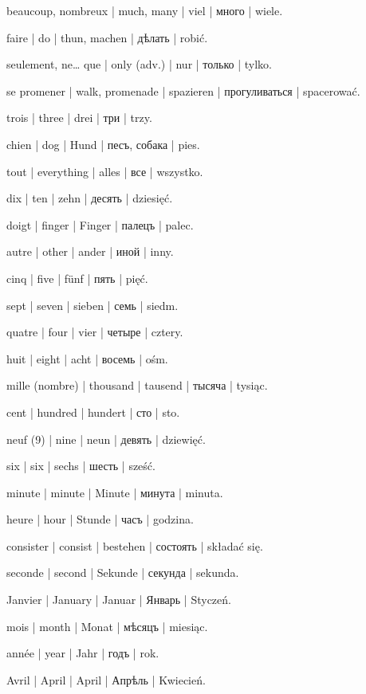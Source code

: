 \begin{ekzvocab}{1em}
 beaucoup, nombreux | much, many | viel | много | wiele.

 faire | do | thun, machen | дѣлать | robić.

 seulement, ne\ldots{} que | only (adv.) | nur | только | tylko.

 se promener | walk, promenade | spazieren | прогуливаться | spacerować.

 trois | three | drei | три | trzy.

 chien | dog | Hund | песъ, собака | pies.

 tout | everything | alles | все | wszystko.

 dix | ten | zehn | десять | dziesięć.

 doigt | finger | Finger | палецъ | palec.

 autre | other | ander | иной | inny.

 cinq | five | fünf | пять | pięć.

 sept | seven | sieben | семь | siedm.

 quatre | four | vier | четыре | cztery.

 huit | eight | acht | восемь | ośm.

 mille (nombre) | thousand | tausend | тысяча | tysiąc.

 cent | hundred | hundert | сто | sto.

 neuf (9) | nine | neun | девять | dziewięć.

 six | six | sechs | шесть | sześć.

 minute | minute | Minute | минута | minuta.

 heure | hour | Stunde | часъ | godzina.

 consister | consist | bestehen | состоять | składać się.

 seconde | second | Sekunde | секунда | sekunda.

 Janvier | January | Januar | Январь | Styczeń.

 mois | month | Monat | мѣсяцъ | miesiąc.

 année | year | Jahr | годъ | rok.

 Avril | April | April | Апрѣль | Kwiecień.


\end{ekzvocab}
